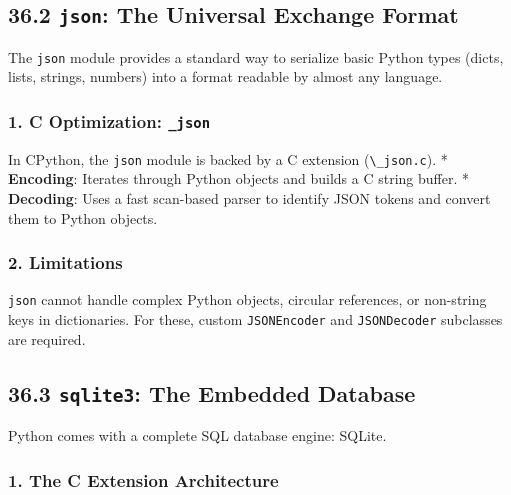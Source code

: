 \hypertarget{json-the-universal-exchange-format}{%
\subsection{\texorpdfstring{36.2 \texttt{json}: The Universal Exchange
Format}{36.2 json: The Universal Exchange Format}}\label{json-the-universal-exchange-format}}

The \passthrough{\lstinline!json!} module provides a standard way to
serialize basic Python types (dicts, lists, strings, numbers) into a
format readable by almost any language.

\hypertarget{c-optimization-_json}{%
\subsubsection{\texorpdfstring{1. C Optimization:
\texttt{\_json}}{1. C Optimization: \_json}}\label{c-optimization-_json}}

In CPython, the \passthrough{\lstinline!json!} module is backed by a C
extension (\passthrough{\lstinline!\_json.c!}). * \textbf{Encoding}:
Iterates through Python objects and builds a C string buffer. *
\textbf{Decoding}: Uses a fast scan-based parser to identify JSON tokens
and convert them to Python objects.

\hypertarget{limitations}{%
\subsubsection{2. Limitations}\label{limitations}}

\passthrough{\lstinline!json!} cannot handle complex Python objects,
circular references, or non-string keys in dictionaries. For these,
custom \passthrough{\lstinline!JSONEncoder!} and
\passthrough{\lstinline!JSONDecoder!} subclasses are required.

\hypertarget{sqlite3-the-embedded-database}{%
\subsection{\texorpdfstring{36.3 \texttt{sqlite3}: The Embedded
Database}{36.3 sqlite3: The Embedded Database}}\label{sqlite3-the-embedded-database}}

Python comes with a complete SQL database engine: SQLite.

\hypertarget{the-c-extension-architecture}{%
\subsubsection{1. The C Extension
Architecture}\label{the-c-extension-architecture}}

